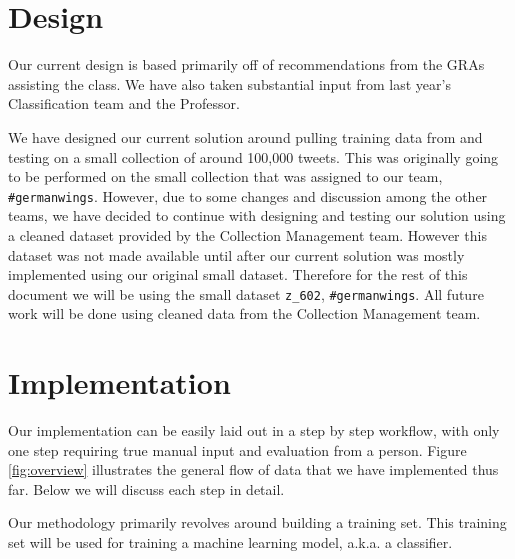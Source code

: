 \section{Design}
Our current design is based primarily off of recommendations from the GRAs assisting the class. We have also taken substantial input from last year's Classification team \cite{cui2015classification} and the Professor.

We have designed our current solution around pulling training data from and testing on a small collection of around 100,000 tweets. This was originally going to be performed on the small collection that was assigned to our team, \texttt{\#germanwings}. However, due to some changes and discussion among the other teams, we have decided to continue with designing and testing our solution using a cleaned dataset provided by the Collection Management team. However this dataset was not made available until after our current solution was mostly implemented using our original small dataset. Therefore for the rest of this document we will be using the small dataset \texttt{z\_602}, \texttt{\#germanwings}. All future work will be done using cleaned data from the Collection Management team.

\section{Implementation}
Our implementation can be easily laid out in a step by step workflow, with only one step requiring true manual input and evaluation from a person. Figure \ref{fig:overview} illustrates the general flow of data that we have implemented thus far. Below we will discuss each step in detail.

Our methodology primarily revolves around building a training set. This training set will be used for training a machine learning model, a.k.a. a classifier.

